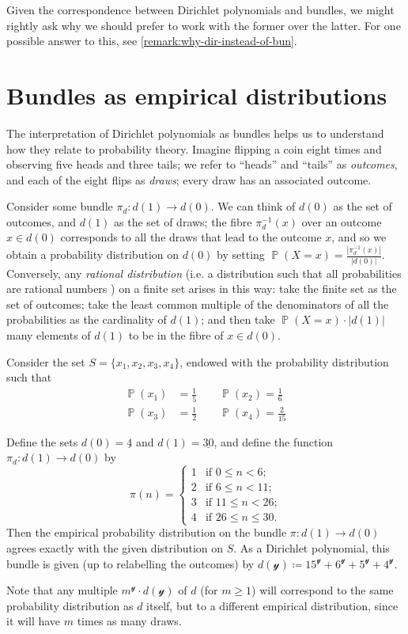 \documentclass[11pt,fleqn]{article}
\renewcommand{\leq}{\leqslant}
\renewcommand{\geq}{\geqslant}
\newcommand{\yon}{\mathcal{y}}
\DeclareMathOperator{\prob}{\mathbb{P}}
\begin{document}
Given the correspondence between Dirichlet polynomials and bundles, we might rightly ask why we should prefer to work with the former over the latter.
For one possible answer to this, see \cref{remark:why-dir-instead-of-bun}.



\section{Bundles as empirical distributions}
\label{section:bun-and-emp}

The interpretation of Dirichlet polynomials as bundles helps us to understand how they relate to probability theory.
Imagine flipping a coin eight times and observing five heads and three tails;
we refer to ``heads'' and ``tails'' as \emph{outcomes}, and each of the eight flips as \emph{draws};
every draw has an associated outcome.

Consider some bundle $\pi_d\colon d(1)\to d(0)$.
We can think of $d(0)$ as the set of outcomes, and $d(1)$ as the set of draws;
the fibre $\pi_d^{-1}(x)$ over an outcome $x\in d(0)$ corresponds to all the draws that lead to the outcome $x$, and so we obtain a probability distribution on $d(0)$ by setting $\prob(X=x)=\frac{|\pi_d^{-1}(x)|}{|d(0)|}$.
Conversely, any \emph{rational distribution} (i.e. a distribution such that all probabilities are rational numbers ) on a finite set arises in this way:
take the finite set as the set of outcomes;
take the least common multiple of the denominators of all the probabilities as the cardinality of $d(1)$;
and then take $\prob(X=x)\cdot |d(1)|$ many elements of $d(1)$ to be in the fibre of $x\in d(0)$.

\begin{example}
  Consider the set $S=\{x_1,x_2,x_3,x_4\}$, endowed with the probability distribution such that
  \[
    \begin{aligned}
      \prob(x_1) &= \frac{1}{5}
      \qquad\prob(x_2) = \frac{1}{6}
    \\\prob(x_3) &= \frac{1}{2}
      \qquad\prob(x_4) = \frac{2}{15}
    \end{aligned}
  \]

  Define the sets $d(0)=\underline{4}$ and $d(1)=\underline{30}$, and define the function $\pi_d\colon d(1)\to d(0)$ by
  \[
    \pi(n) =
    \begin{cases}
      1 &\mbox{if $0\leq n<6$;}
    \\2 &\mbox{if $6\leq n<11$;}
    \\3 &\mbox{if $11\leq n<26$;}
    \\4 &\mbox{if $26\leq n\leq30$.}
    \end{cases}
  \]
  Then the empirical probability distribution on the bundle $\pi\colon d(1)\to d(0)$ agrees exactly with the given distribution on $S$.
  As a Dirichlet polynomial, this bundle is given (up to relabelling the outcomes) by $d(\yon)\coloneqq15^\yon+6^\yon+5^\yon+4^\yon$.

  Note that any multiple $m^\yon\cdot d(\yon)$ of $d$ (for $m\geq1$) will correspond to the same probability distribution as $d$ itself, but to a different empirical distribution, since it will have $m$ times as many draws.
\end{example}
\end{document}
